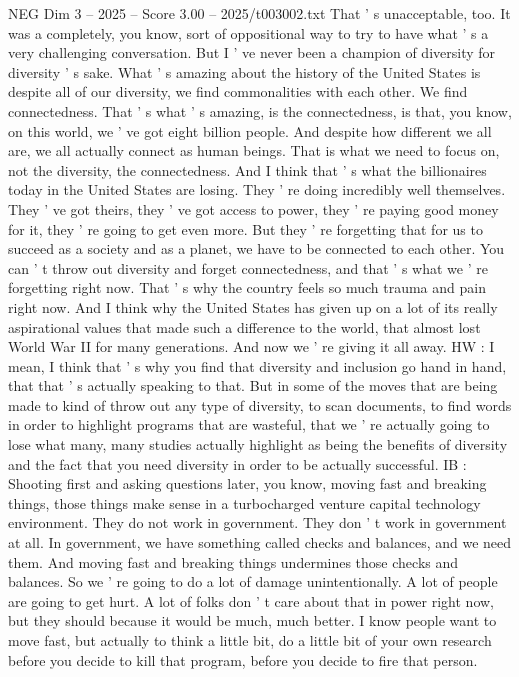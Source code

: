 \begin{textsample}{NEG Dim 3 – 2025 – Score 3.00 – 2025/t003002.txt}
That ' s unacceptable, too.
It was a completely, you know, sort of oppositional way to try to have what ' s a very challenging conversation.
But I ' ve never been a champion of diversity for diversity ' s sake.
What ' s amazing about the history of the United States is despite all of our diversity, we find commonalities with each other.
We find connectedness.
That ' s what ' s amazing, is the connectedness, is that, you know, on this world, we ' ve got eight billion people.
And despite how different we all are, we all actually connect as human beings.
That is what we need to focus on, not the diversity, the connectedness.
And I think that ' s what the billionaires today in the United States are losing.
They ' re doing incredibly well themselves.
They ' ve got theirs, they ' ve got access to power, they ' re paying good money for it, they ' re going to get even more.
But they ' re forgetting that for us to succeed as a society and as a planet, we have to be connected to each other.
You can ' t throw out diversity and forget connectedness, and that ' s what we ' re forgetting right now.
That ' s why the country feels so much trauma and pain right now.
And I think why the United States has given up on a lot of its really aspirational values that made such a difference to the world, that almost lost World War II for many generations.
And now we ' re giving it all away.
HW : I mean, I think that ' s why you find that diversity and inclusion go hand in hand, that that ' s actually speaking to that.
But in some of the moves that are being made to kind of throw out any type of diversity, to scan documents, to find words in order to highlight programs that are wasteful, that we ' re actually going to lose what many, many studies actually highlight as being the benefits of diversity and the fact that you need diversity in order to be actually successful.
IB : Shooting first and asking questions later, you know, moving fast and breaking things, those things make sense in a turbocharged venture capital technology environment.
They do not work in government.
They don ' t work in government at all.
In government, we have something called checks and balances, and we need them.
And moving fast and breaking things undermines those checks and balances.
So we ' re going to do a lot of damage unintentionally.
A lot of people are going to get hurt.
A lot of folks don ' t care about that in power right now, but they should because it would be much, much better.
I know people want to move fast, but actually to think a little bit, do a little bit of your own research before you decide to kill that program, before you decide to fire that person.

\end{textsample}
